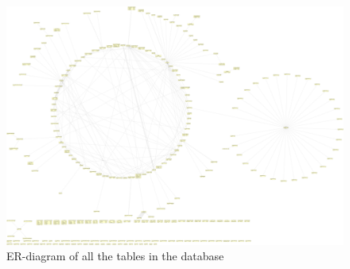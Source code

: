 \documentclass{cslthse-msc}
\begin{document}
\begin{appendices}
\begin{figure}
\includegraphics[angle = 270, width = \textwidth]{Pictures/ER.png}
\caption{ER-diagram of all the tables in the database}
\label{fig:ER}
\end{figure}

\end{appendices}
\end{document}
